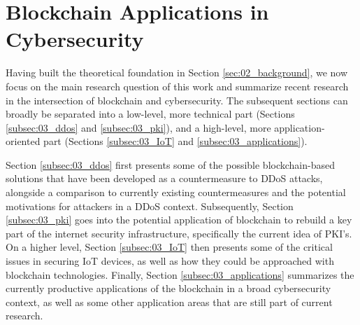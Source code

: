 \section{Blockchain Applications in Cybersecurity}
\label{sec:03_related_work}

Having built the theoretical foundation in Section \ref{sec:02_background}, we now focus on the main research question of this work and summarize recent research in the intersection of blockchain and cybersecurity. The subsequent sections can broadly be separated into a low-level, more technical part (Sections \ref{subsec:03_ddos} and \ref{subsec:03_pki}), and a high-level, more application-oriented part (Sections \ref{subsec:03_IoT} and \ref{subsec:03_applications}).

Section \ref{subsec:03_ddos} first presents some of the possible blockchain-based solutions that have been developed as a countermeasure to DDoS attacks, alongside a comparison to currently existing countermeasures and the potential motivations for attackers in a DDoS context. Subsequently, Section \ref{subsec:03_pki} goes into the potential application of blockchain to rebuild a key part of the internet security infrastructure, specifically the current idea of PKI's. On a higher level, Section \ref{subsec:03_IoT} then presents some of the critical issues in securing IoT devices, as well as how they could be approached with blockchain technologies. Finally, Section \ref{subsec:03_applications} summarizes the currently productive applications of the blockchain in a broad cybersecurity context, as well as some other application areas that are still part of current research.





